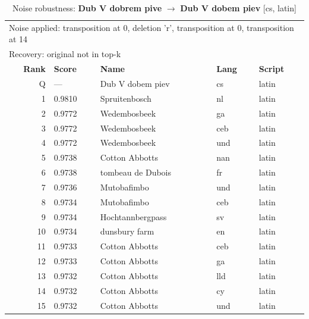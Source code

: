 \begin{table}[htbp]
\centering
\small
\caption{Noise robustness: \textbf{Dub V dobrem pive} $\rightarrow$ \textbf{Dub V dobem piev} [cs, latin]}
\label{tab:noise-2}
\begin{tabular}{rllll}
\toprule
\multicolumn{5}{l}{\small Noise applied: transposition at 0, deletion 'r', transposition at 0, transposition at 14} \\
\multicolumn{5}{l}{\small Recovery: original not in top-k} \\
\midrule
\textbf{Rank} & \textbf{Score} & \textbf{Name} & \textbf{Lang} & \textbf{Script} \\
\midrule
\rowcolor{gray!20} Q & --- & Dub V dobem piev & cs & latin \\
\midrule
1 & 0.9810 & Spruitenbosch & nl & latin \\
2 & 0.9772 & Wedembosbeek & ga & latin \\
3 & 0.9772 & Wedembosbeek & ceb & latin \\
4 & 0.9772 & Wedembosbeek & und & latin \\
5 & 0.9738 & Cotton Abbotts & nan & latin \\
6 & 0.9738 & tombeau de Dubois & fr & latin \\
7 & 0.9736 & Mutobafimbo & und & latin \\
8 & 0.9734 & Mutobafimbo & ceb & latin \\
9 & 0.9734 & Hochtannbergpass & sv & latin \\
10 & 0.9734 & dunsbury farm & en & latin \\
11 & 0.9733 & Cotton Abbotts & ceb & latin \\
12 & 0.9733 & Cotton Abbotts & ga & latin \\
13 & 0.9732 & Cotton Abbotts & lld & latin \\
14 & 0.9732 & Cotton Abbotts & cy & latin \\
15 & 0.9732 & Cotton Abbotts & und & latin \\
\bottomrule
\end{tabular}
\end{table}

